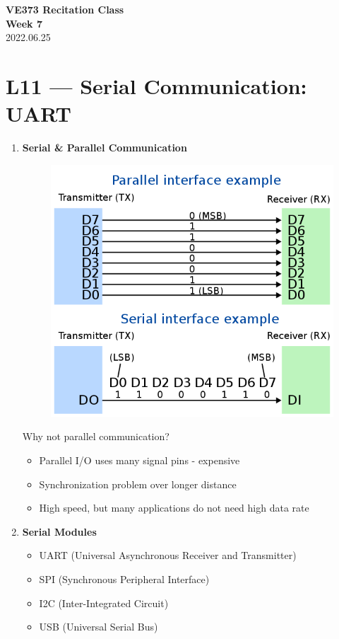 \documentclass[a4paper]{article}
\begin{document}
\renewcommand{\thesection}{\Roman{section}}
\renewcommand{\thesubsection}{\Alph{subsection}}
\renewcommand{\thesubsubsection}{\thesubsection.\arabic{subsubsection}}
\renewcommand{\d}{\: \mathrm{d}}
\newcommand{\e}{\mathrm{e}}

\begin{center}
  \textbf{\Large VE373 Recitation Class}\\[1em]
  \textbf{\large Week 7} \\[1em]
  2022.06.25 \\[1em]
\end{center}

\section*{L11 --- Serial Communication: UART}
  \begin{enumerate}[label = \arabic*.]
    \item \textbf{Serial \& Parallel Communication}
      \begin{figure}[H]
        \centering
        \includegraphics[width=0.4\linewidth]{Serial_parallel_communication.png}
        \label{fig:Serial_parallel_communication.png}
      \end{figure}

      \par Why not parallel communication?
      \begin{itemize}[leftmargin = 1cm]
        \item Parallel I/O uses many signal pins - expensive
        \item Synchronization problem over longer distance
        \item High speed, but many applications do not need high data rate
      \end{itemize}

    \item \textbf{Serial Modules}
      \begin{itemize}[leftmargin = 1cm]
        \item UART (Universal Asynchronous Receiver and Transmitter)
        \item SPI (Synchronous Peripheral Interface)
        \item I2C (Inter-Integrated Circuit)
        \item USB (Universal Serial Bus)
      \end{itemize}


\end{enumerate}
\end{document}
